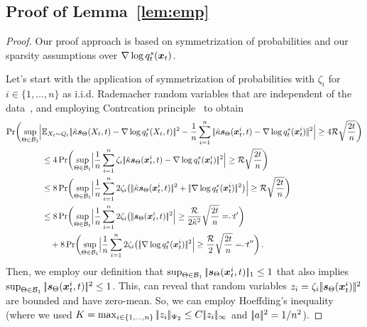 \subsection{Proof of Lemma~\ref{lem:emp}}\label{proof:lememp}
\begin{proof}
Our proof approach is based on symmetrization of probabilities and  our sparsity  assumptions over $\nabla\log q^s_t(\textcolor{black}{\boldsymbol{x}}_t)$. 

Let's start with the application of symmetrization of probabilities with $\zeta_i$ for $i\in \{1,\dots,n\}$ as i.i.d. Rademacher random variables that are independent of the data~\citet[Lemma 16.1]{van2016estimation}, and employing Contrcation principle~\citep[Theorem~4.4]{ledoux2013probability} to obtain  
\allowdisplaybreaks
\begingroup
 \begin{align*}
     \Pr \biggl(\sup_{\NetP\in \paramspaceone}\Bigl|&\E_{X_t\sim Q_t}\norm{\scaleh\scoref(X_t,t)-\nabla\log q^s_t(X_t,t)}^2
     -\frac{1}{n} \sum_{i=1}^{n}  \norm{\scaleh\scoref(\x_t^i,t)-\nabla\log q^s_t(\x_t^i)}^2\Bigr| \ge 4\Rs\sqrt{\frac{2t}{n}}\biggr)\\
     &\le 4 \Pr \biggl(\sup_{\NetP\in \paramspaceone}\Bigl|\frac{1}{n} \sum_{i=1}^{n} \zeta_i \norm{\scaleh\scoref(\x_t^i,t)-\nabla\log q^s_t(\x_t^i)}^2\Bigr| \ge \Rs\sqrt{\frac{2t}{n}}\biggr)\\
     &\le 8 \Pr \biggl(\sup_{\NetP\in \paramspaceone}\Bigl|\frac{1}{n} \sum_{i=1}^{n} 2\zeta_i \bigl( \norm{\scaleh\scoref(\x_t^i,t)}^2+\norm{\nabla\log q^s_t(\x_t^i)}^2\bigr)\Bigr| \ge \Rs\sqrt{\frac{2t}{n}}\biggr)\\
     &\le 8 \Pr \biggl(\sup_{\NetP\in \paramspaceone}\Bigl|\frac{1}{n} \sum_{i=1}^{n} 2\zeta_i \bigl( \norm{\scoref(\x_t^i,t)}^2\Bigr| \ge \frac{\Rs}{2\scaleh^2}\sqrt{\frac{2t}{n}}\eqd t'\biggr)\\
     &~~~+8 \Pr \biggl(\sup_{\NetP\in \paramspaceone}\Bigl|\frac{1}{n} \sum_{i=1}^{n} 2\zeta_i \bigl( \norm{\nabla\log q^s_t(\x_t^i)}^2\Bigr| \ge \frac{\Rs}{2}\sqrt{\frac{2t}{n}}\eqd t''\biggr)\,.
 \end{align*}
 \endgroup
 Then, we employ our definition that $\sup_{\textcolor{black}{\Theta}\in \textcolor{black}{\mathcal{B}_1}} |\!|\textcolor{black}{\textcolor{black}{\boldsymbol{s}}_{\textcolor{black}{\Theta}}}(\textcolor{black}{\boldsymbol{x}}_t^i,t)|\!|_1\le 1$ that also implies  $\sup_{\textcolor{black}{\Theta}\in \textcolor{black}{\mathcal{B}_1}} |\!|\textcolor{black}{\textcolor{black}{\boldsymbol{s}}_{\textcolor{black}{\Theta}}}(\textcolor{black}{\boldsymbol{x}}_t^i,t)|\!|^2\le 1$. 
 This, can reveal that random variables $z_i=\zeta_i |\!|\textcolor{black}{\textcolor{black}{\boldsymbol{s}}_{\textcolor{black}{\Theta}}}(\textcolor{black}{\boldsymbol{x}}_t^i)|\!|^2$ are bounded and have zero-mean. 
 So, we can employ Hoeffding's inequality~\citep[Theorem~2.6.3]{Vershynin2018} (where we used $K=\max_{i\in \{1,\dots,n\}} |\!|z_i|\!|_{\Psi_2}\le C|\!|z_i|\!|_{\infty}$ and $|\!|a|\!|^2=1/n^2$). 

\end{proof}
